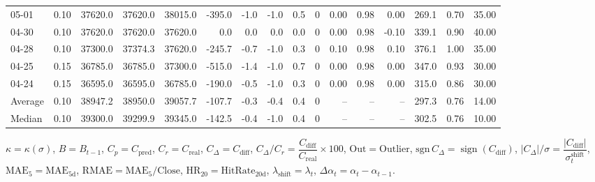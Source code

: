 \begin{threeparttable}
{\begin{tabular}{lrrrrrrrrrrrrrrr}
  05-01 &     0.10 & 37620.0 & 37620.0 & 38015.0 &     -395.0 &           -1.0 &                     -1.0 &                 0.5 &              0 &       0.00 &      0.98 &           0.00 &            269.1 &            0.70 &                  35.00 \\
  04-30 &     0.10 & 37620.0 & 37620.0 & 37620.0 &        0.0 &            0.0 &                      0.0 &                 0.0 &              0 &       0.00 &      0.98 &          -0.10 &            339.1 &            0.90 &                  40.00 \\
  04-28 &     0.10 & 37300.0 & 37374.3 & 37620.0 &     -245.7 &           -0.7 &                     -1.0 &                 0.3 &              0 &       0.10 &      0.98 &           0.10 &            376.1 &            1.00 &                  35.00 \\
  04-25 &     0.15 & 36785.0 & 36785.0 & 37300.0 &     -515.0 &           -1.4 &                     -1.0 &                 0.7 &              0 &       0.00 &      0.98 &           0.00 &            347.0 &            0.93 &                  30.00 \\
  04-24 &     0.15 & 36595.0 & 36595.0 & 36785.0 &     -190.0 &           -0.5 &                     -1.0 &                 0.3 &              0 &       0.00 &      0.98 &           0.00 &            315.0 &            0.86 &                  30.00 \\
Average &     0.10 & 38947.2 & 38950.0 & 39057.7 &     -107.7 &           -0.3 &                     -0.4 &                 0.4 &              0 &         -- &        -- &             -- &            297.3 &            0.76 &                  14.00 \\
 Median &     0.10 & 39300.0 & 39299.9 & 39345.0 &     -142.5 &           -0.4 &                     -1.0 &                 0.4 &              0 &         -- &        -- &             -- &            302.5 &            0.76 &                  10.00 \\
\bottomrule
\end{tabular}
}
\begin{tablenotes}\footnotesize
\item $\kappa=\kappa(\sigma)$, $B=B_{t-1}$, $C_p=C_{\text{pred}}$, $C_r=C_{\text{real}}$, $C_\Delta=C_{\text{diff}}$, $C_\Delta/C_r=\dfrac{C_{\text{diff}}}{C_{\text{real}}}\times100$, $\mathrm{Out}=\text{Outlier}$, $\mathrm{sgn}\,C_\Delta=\operatorname{sign}(C_{\text{diff}})$, $|C_\Delta|/\sigma=\dfrac{|C_{\text{diff}}|}{\sigma_t^{\text{shift}}}$, $\mathrm{MAE}_5=\mathrm{MAE}_{5\text{d}}$, $\mathrm{RMAE}= \mathrm{MAE}_5 / \text{Close}$, $\mathrm{HR}_{20}=\mathrm{HitRate}_{20\text{d}}$, 
$\lambda_{\text{shift}}=\lambda_t$, 
$\Delta\alpha_t=\alpha_t-\alpha_{t-1}$.
\end{tablenotes}
\end{threeparttable}
\endgroup

